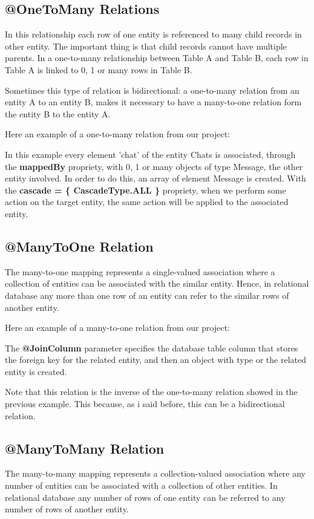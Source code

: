 \documentclass[a4paper]{article}
\begin{document}
\subsection{@OneToMany Relations}
In this relationship each row of one entity is referenced to many child records in other entity. The important thing is that child records cannot have multiple parents. In a one-to-many relationship between Table A and Table B, each row in Table A is linked to 0, 1 or many rows in Table B.

Sometimes this type of relation is bidirectional: a one-to-many relation from an entity A to an entity B, makes it necessary to have a many-to-one relation form the entity B to the entity A.

Here an example of a one-to-many relation from our project:


In this example every element 'chat' of the entity Chats is associated, through the \textbf{mappedBy} propriety, with 0, 1 or many objects of type Message, the other entity involved. In order to do this, an array of element Message is created. With the \textbf{cascade = \{ CascadeType.ALL \}} propriety, when we perform some action on the target entity, the same action will be applied to the associated entity.

\subsection{@ManyToOne Relation}
The many-to-one mapping represents a single-valued association where a collection of entities can be associated with the similar entity. Hence, in relational database any more than one row of an entity can refer to the similar rows of another entity.

Here an example of a many-to-one relation from our project:


The \textbf{@JoinColumn} parameter specifies the database table column that stores the foreign key for the related entity, and then an object with type or the related entity is created.

Note that this relation is the inverse of the one-to-many relation showed in the previous example. This because, as i said before, this can be a bidirectional relation. 

\subsection{@ManyToMany Relation}
The many-to-many mapping represents a collection-valued association where any number of entities can be associated with a collection of other entities. In relational database any number of rows of one entity can be referred to any number of rows of another entity.
\end{document}
